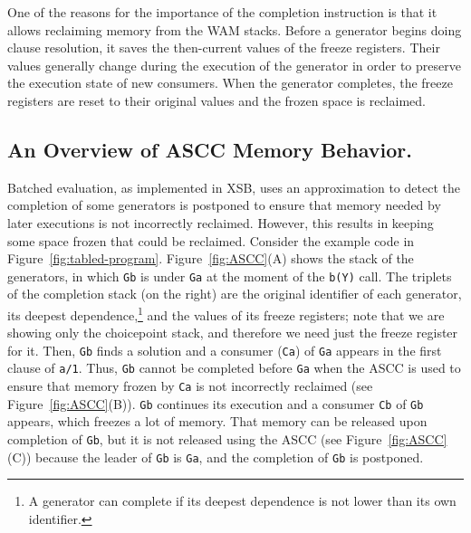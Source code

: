\documentclass{./tlp}
\renewcommand{\mnote}[1]{}
\newcommand{\redsect}{\vspace{-1em}}
\begin{document}
One of the reasons for the importance of the completion instruction is
that it allows reclaiming memory from the WAM stacks. Before a
generator begins doing clause resolution, it saves the then-current
values of the 
freeze registers. Their values generally
change during the execution of the generator in order to preserve the
execution state of new consumers. When the generator completes, the
freeze registers are reset to their original values and
the frozen space is reclaimed.

\redsect
\subsection{An Overview of ASCC Memory Behavior.} 
\label{sec:ASCC-SCC} 

\mnote{This para. is v. diff. to understand.}
Batched evaluation, as implemented in XSB,
uses an approximation to detect  the completion
of some generators is postponed to ensure that memory needed by later
executions is not incorrectly reclaimed.  However, this results in
keeping some space frozen that could be reclaimed.  Consider the
example code in Figure~\ref{fig:tabled-program}.
Figure~\ref{fig:ASCC}(A) shows the stack of the generators, in which
\lstinline{Gb} is under \lstinline{Ga} at the moment of the \lstinline{b(Y)} call. The
triplets of the completion stack (on the right) are the original
identifier of each generator, its deepest dependence,\footnote{A
  generator can complete if its deepest dependence is not lower than
  its own identifier.} and the values of its freeze registers; note
that we are showing only the choicepoint stack, and therefore we need
just the freeze register for it.  Then, \lstinline{Gb} finds a solution
and a consumer (\lstinline{Ca}) of \lstinline{Ga} appears in the first
clause of \lstinline{a/1}.  Thus, \lstinline{Gb} cannot be completed before
\lstinline{Ga} when the ASCC is used to ensure that memory frozen by
\lstinline{Ca} is not incorrectly reclaimed (see
Figure~\ref{fig:ASCC}(B)).  \lstinline{Gb} continues its execution and a
consumer \lstinline{Cb} of \lstinline{Gb} appears, which freezes a lot of
memory.  That memory can be released upon completion of \lstinline{Gb},
but it is not released using the ASCC (see Figure~\ref{fig:ASCC}(C))
because the leader of \lstinline{Gb} is \lstinline{Ga}, and the completion
of \lstinline{Gb} is postponed.
\end{document}

